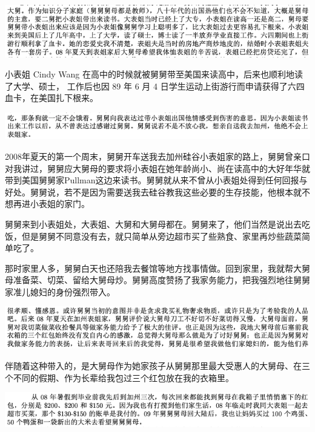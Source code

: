 \documentclass[9pt, b5paper]{article}
\begin{document}
\begin{center}
\includegraphics[width=.9\linewidth]{./pic/p1p92-3.png}
\end{center}

小表姐 Cindy Wang 在高中的时候就被舅舅带至美国来读高中，后来也顺利地读了大学、硕士， 工作后也因 89 年 6 月 4 日学生运动上街游行而申请获得了六四血卡，在美国扎下根来。

\begin{center}
\includegraphics[width=.9\linewidth]{./pic/p1p34-5.png}
\end{center}

2008年夏天的第一个周末，舅舅开车送我去加州硅谷小表姐家的路上，舅舅曾亲口对我讲过，舅舅应大舅母的要求将小表姐在她年龄尚小、尚在读高中的大好年华就带到美国舅舅家Pullman这边来读书。舅舅就从来不曾从小表姐处得到任何回报与好处。舅舅说，若不是因为需要送我去硅谷教我这些必要的生存技能，他根本就不想再进小表姐的家门。

舅舅来到小表姐处，大表姐、大舅和大舅母都在。舅舅来了，他们当然是说出去吃饭，但是舅舅不同意没有去，就只简单从旁边超市买了些熟食、家里再炒些蔬菜简单吃了。 

那时家里人多，舅舅白天也还陪我去餐馆等地方找事情做。回到家里，我就帮大舅母准备菜、切菜、留给大舅母炒。舅舅高度赞扬了我家务能力，把我强烈地往舅舅家准儿媳妇的身份强烈带入。 

\begin{center}
\includegraphics[width=.9\linewidth]{./pic/p1p136-2.png}
\end{center}

伴随着这种带入的，是大舅母作为她家孩子从舅舅那里最大受惠人的大舅母、在三个不同的假期、作为长辈给我包过三个红包放在我的衣箱里。 

\begin{center}
\includegraphics[width=.9\linewidth]{./pic/p1p47.png}
\end{center}
\end{document}

